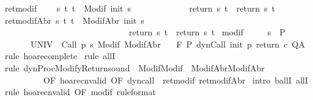 \begin{isabellebody}
\ ret{\isacharunderscore}modif{\isacharcolon}\isanewline
\ \ \ \ {\isachardoublequoteopen}{\isasymforall}s\ t{\isachardot}\ t\ {\isasymin}\ Modif\ {\isacharparenleft}init\ s{\isacharparenright}\ \isanewline
\ \ \ \ \ \ \ \ \ \ \ {\isasymlongrightarrow}\ return{\isacharprime}\ s\ t\ {\isacharequal}\ return\ s\ t{\isachardoublequoteclose}\isanewline
{}\ ret{\isacharunderscore}modifAbr{\isacharcolon}\ {\isachardoublequoteopen}{\isasymforall}s\ t{\isachardot}\ t\ {\isasymin}\ ModifAbr\ {\isacharparenleft}init\ s{\isacharparenright}\ \isanewline
\ \ \ \ \ \ \ \ \ \ \ \ \ \ \ \ \ \ \ \ \ \ \ \ \ \ \ \ \ {\isasymlongrightarrow}\ return{\isacharprime}\ s\ t\ {\isacharequal}\ return\ s\ t{\isachardoublequoteclose}\isanewline
{}\ modif{\isacharcolon}\ \isanewline
\ \ \ \ {\isachardoublequoteopen}{\isasymforall}s\ {\isasymin}\ P{\isachardot}\ {\isasymforall}{\isasymsigma}{\isachardot}\ \ \isanewline
\ \ \ \ \ \ \ {\isasymGamma}{\isacharcomma}{\isasymTheta}{\isasymturnstile}\isactrlbsub {\isacharslash}UNIV\isactrlesub \ {\isacharbraceleft}{\isasymsigma}{\isacharbraceright}\ Call\ {\isacharparenleft}p\ s{\isacharparenright}\ {\isacharparenleft}Modif\ {\isasymsigma}{\isacharparenright}{\isacharcomma}{\isacharparenleft}ModifAbr\ {\isasymsigma}{\isacharparenright}{\isachardoublequoteclose}\ \isanewline
{}\ {\isachardoublequoteopen}{\isasymGamma}{\isacharcomma}{\isasymTheta}{\isasymturnstile}\isactrlbsub {\isacharslash}F\isactrlesub \ P\ {\isacharparenleft}dynCall\ init\ p\ return\ c{\isacharparenright}\ Q{\isacharcomma}A{\isachardoublequoteclose}\isanewline
%
\isadelimproof
%
\endisadelimproof
%
\isatagproof
{}\isamarkupfalse%
\ {\isacharparenleft}rule\ hoare{\isacharunderscore}complete{\isacharprime}{\isacharparenright}\isanewline
{}\isamarkupfalse%
\ {\isacharparenleft}rule\ allI{\isacharparenright}\isanewline
{}\isamarkupfalse%
\ {\isacharparenleft}rule\ dynProcModifyReturn{\isacharunderscore}sound\ {\isacharbrackleft}\ Modif{\isacharequal}Modif\ \ ModifAbr{\isacharequal}ModifAbr{\isacharcomma}\isanewline
\ \ \ \ \ \ \ \ \ \ OF\ hoare{\isacharunderscore}cnvalid\ {\isacharbrackleft}OF\ dyn{\isacharunderscore}call{\isacharbrackright}\ {\isacharunderscore}\ ret{\isacharunderscore}modif\ ret{\isacharunderscore}modifAbr{\isacharbrackright}{\isacharparenright}\isanewline
{}\isamarkupfalse%
\ {\isacharparenleft}intro\ ballI\ allI{\isacharparenright}\isanewline
{}\isamarkupfalse%
\ {\isacharparenleft}rule\ hoare{\isacharunderscore}cnvalid\ {\isacharbrackleft}OF\ modif\ {\isacharbrackleft}rule{\isacharunderscore}format{\isacharbrackright}{\isacharbrackright}{\isacharparenright}\isanewline

\end{isabellebody}
